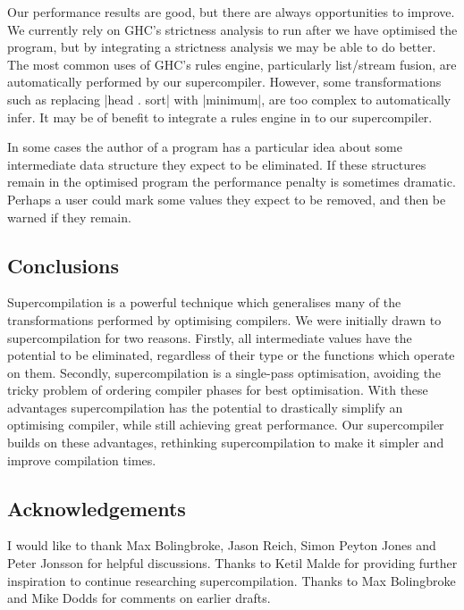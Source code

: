 \documentclass[draft]{sigplanconf}
\begin{document}
Our performance results are good, but there are always opportunities to improve. We currently rely on GHC's strictness analysis to run after we have optimised the program, but by integrating a strictness analysis we may be able to do better. The most common uses of GHC's rules engine, particularly list/stream fusion, are automatically performed by our supercompiler. However, some transformations such as replacing |head . sort| with |minimum|, are too complex to automatically infer. It may be of benefit to integrate a rules engine in to our supercompiler.

In some cases the author of a program has a particular idea about some intermediate data structure they expect to be eliminated. If these structures remain in the optimised program the performance penalty is sometimes dramatic. Perhaps a user could mark some values they expect to be removed, and then be warned if they remain.

\subsection{Conclusions}

Supercompilation is a powerful technique which generalises many of the transformations performed by optimising compilers. We were initially drawn to supercompilation for two reasons. Firstly, all intermediate values have the potential to be eliminated, regardless of their type or the functions which operate on them. Secondly, supercompilation is a single-pass optimisation, avoiding the tricky problem of ordering compiler phases for best optimisation. With these advantages supercompilation has the potential to drastically simplify an optimising compiler, while still achieving great performance. Our supercompiler builds on these advantages, rethinking supercompilation to make it simpler and improve compilation times.

\subsection*{Acknowledgements}

I would like to thank Max Bolingbroke, Jason Reich, Simon Peyton Jones and Peter Jonsson for helpful discussions. Thanks to Ketil Malde for providing further inspiration to continue researching supercompilation. Thanks to Max Bolingbroke and Mike Dodds for comments on earlier drafts.



\end{document}
